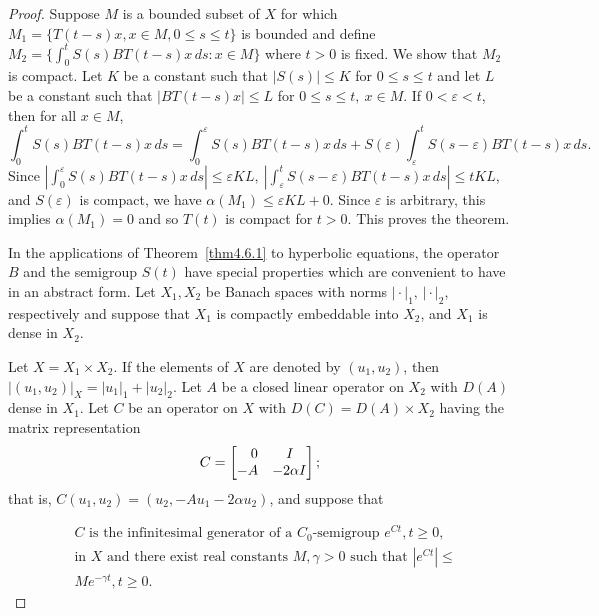 \documentclass{surv-l}
\theoremstyle{plain}
\theoremstyle{definition}
\numberwithin{equation}{section}
\numberwithin{figure}{chapter}
\begin{document}
\begin{proof}
Suppose $M$ is a bounded subset of $X$ for which $M_{1}=\{T(t-s)x, x\in M, 0\leq s\leq t\}$ is bounded and define $M_{2}=\{\int_{0}^{t}S(s)BT(t-s)x\,ds\!:x\in M\}$ where $t>0$ is fixed. We show that $M_{2}$ is compact. Let $K$ be a constant such that $|S(s)|\leq K$ for $0\leq s \leq t$ and let $L$ be a constant such that $|BT(t-s)x|\leq L$ for $0\leq s\leq t,\ x\in M$. If $ 0<\varepsilon <t$, then for all $x\in M$,
\begin{equation*}
\int_{0}^{t}S(s)BT(t-s)x\,ds=\int_{0}^{\varepsilon}S(s)BT(t-s)x\,ds+S(\varepsilon)\int_{\varepsilon}^{t}S(s-\varepsilon)
BT(t-s)x \,ds.
\end{equation*}
Since $|\int_{0}^{\varepsilon}S(s)BT(t-s)x\,ds|\leq\varepsilon KL,\ | \int_{\varepsilon}^{t}S(s-\varepsilon)BT(t-s)x\,ds|\leq tKL$, and $S(\varepsilon)$ is compact, we have $\alpha(M_{1})\leq\varepsilon KL +0$. Since $\varepsilon$ is arbitrary, this implies $\alpha(M_{1})=0$ and so $T(t)$ is compact for $t>0$. This proves the theorem.

In the applications of Theorem~\ref{thm4.6.1} to hyperbolic equations, the operator $B$ and the semigroup $S(t)$ have special properties which are convenient to have in an abstract form. Let $X_{1}, X_{2}$ be Banach spaces with norms $|\!\cdot|_{1}, \,|\!\cdot|_{2}$, respectively and suppose that $X_{1}$ is compactly embeddable into $X_{2}$, and $X_{1}$ is dense in $X_{2}$.

Let $X=X_{1}\times X_{2}$. If the elements of $X$ are denoted by $(u_{1}, u_{2})$, then $|(u_{1}, u_{2})|_{X}=|u_{1}|_{1}+|u_{2}|_{2}$. Let $A$ be a closed linear operator on $X_{2}$ with $D(A)$ dense in $X_{1}$. Let $C$ be an operator on $X$ with $D(C)=D(A)\times X_{2}$ having the matrix representation
\begin{align}\label{chap04:eq6.6}
C=\left[\begin{array}{@{}ll@{}}
\quad0 & \quad I\\
-A & -2\alpha I
\end{array}\right];
\end{align}
that is, $C(u_{1}, u_{2})=(u_{2}, -Au_{1}-2\alpha u_{2})$, and suppose that

\begin{equation}\label{chap04:eq6.7}
\begin{split}
&C\text{ is the infinitesimal generator of a } C_{0}\text{-semigroup } e^{Ct}, t\geq 0,\\
&\text{in }X \text{ and there exist real constants } M, \gamma>0 \text{ such that } |e^{Ct}|\leq\\
&Me^{-\gamma t}, t\geq 0.
\end{split}
\end{equation}


\end{proof}
\end{document}
